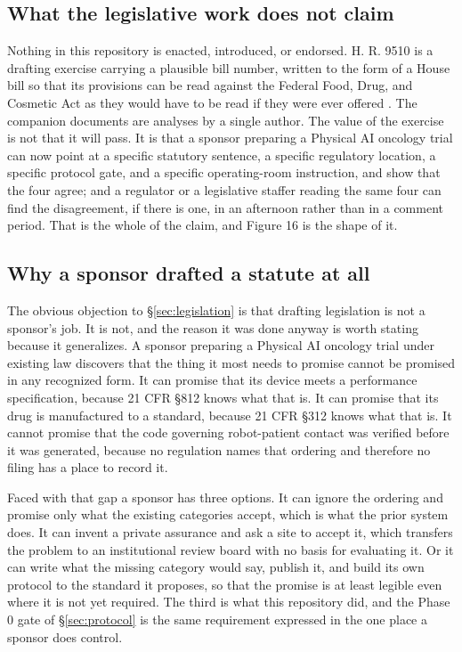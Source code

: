 \subsection{What the legislative work does not claim}

Nothing in this repository is enacted, introduced, or endorsed. H. R. 9510 is a
drafting exercise carrying a plausible bill number, written to the form of a
House bill so that its provisions can be read against the Federal Food, Drug,
and Cosmetic Act as they would have to be read if they were ever offered
\cite{hr9510billv5}. The companion documents are analyses by a single author.
The value of the exercise is not that it will pass. It is that a sponsor
preparing a Physical AI oncology trial can now point at a specific statutory
sentence, a specific regulatory location, a specific protocol gate, and a
specific operating-room instruction, and show that the four agree; and a
regulator or a legislative staffer reading the same four can find the
disagreement, if there is one, in an afternoon rather than in a comment period.
That is the whole of the claim, and Figure 16 is the shape of it.

\subsection{Why a sponsor drafted a statute at all}

The obvious objection to \S\ref{sec:legislation} is that drafting legislation is
not a sponsor's job. It is not, and the reason it was done anyway is worth
stating because it generalizes. A sponsor preparing a Physical AI oncology trial
under existing law discovers that the thing it most needs to promise cannot be
promised in any recognized form. It can promise that its device meets a
performance specification, because 21 CFR \S 812 knows what that is. It can
promise that its drug is manufactured to a standard, because 21 CFR \S 312 knows
what that is. It cannot promise that the code governing robot-patient contact
was verified before it was generated, because no regulation names that ordering
and therefore no filing has a place to record it.

Faced with that gap a sponsor has three options. It can ignore the ordering and
promise only what the existing categories accept, which is what the prior system
does. It can invent a private assurance and ask a site to accept it, which
transfers the problem to an institutional review board with no basis for
evaluating it. Or it can write what the missing category would say, publish it,
and build its own protocol to the standard it proposes, so that the promise is
at least legible even where it is not yet required. The third is what this
repository did, and the Phase 0 gate of \S\ref{sec:protocol} is the same
requirement expressed in the one place a sponsor does control.

